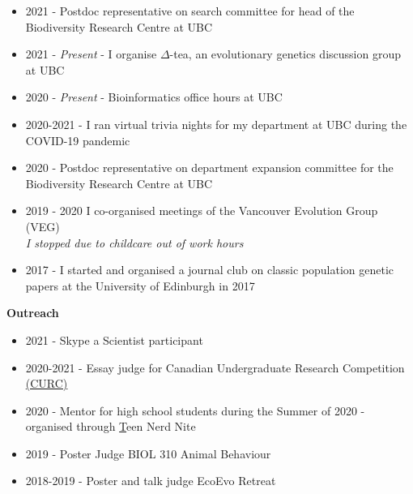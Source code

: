 \documentclass[11pt]{article}
\newenvironment{innerlist}[1][\enskip\textbullet]%
        {\begin{itemize}[#1,leftmargin=*,parsep=0pt,itemsep=0pt,topsep=0pt,partopsep=0pt]}
        {\end{itemize}}
\begin{document}
\begin{innerlist}
  \setlength\itemsep{0.3em}
	\item[] 2021 - Postdoc representative on search committee for head of the Biodiversity Research Centre at UBC

	\item[] 2021 - \textit{Present} - I organise $\Delta$-tea, an evolutionary genetics discussion group at UBC
	
	\item[] 2020 - \textit{Present} - Bioinformatics office hours at UBC 
	
	\item[] 2020-2021 - I ran virtual trivia nights for my department at UBC during the COVID-19 pandemic
	
	\item[] 2020 - Postdoc representative on department expansion committee for the Biodiversity Research Centre at UBC


	\item[] 2019 - 2020 I co-organised meetings of the Vancouver Evolution Group (VEG)\\\emph{I stopped due to childcare out of work hours}

	\item[] 2017 - I started and organised a journal club on classic population genetic papers at the University of Edinburgh in 2017

\end{innerlist}
\vspace{.1275in}

	{\bf Outreach}
\vspace{.1275in}

\begin{innerlist}
  \setlength\itemsep{0.3em}

	\item[] 2021 - Skype a Scientist participant

	\item[] 2020-2021 - Essay judge for Canadian Undergraduate Research Competition \href{https://www.canadacurc.com/}{(CURC)}
	
	\item[] 2020 - Mentor for high school students during the Summer of 2020 - organised through \href{https://teennerdnite.wordpress.com/}Teen Nerd Nite

	\item[] 2019 - Poster Judge BIOL 310 Animal Behaviour

	\item[] 2018-2019 - Poster and talk judge EcoEvo Retreat

\end{innerlist}
\pagebreak
\end{document}

